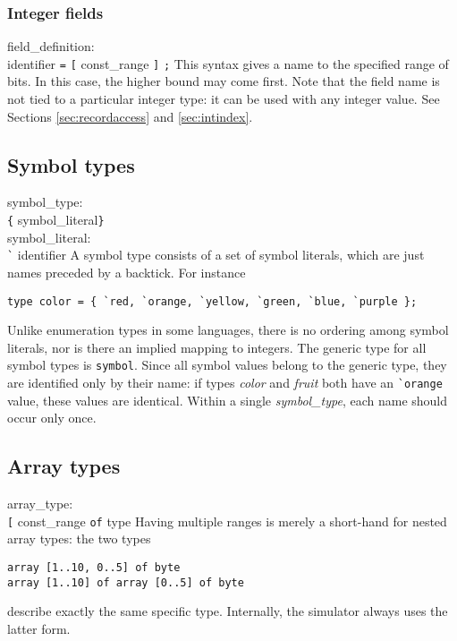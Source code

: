 
\subsubsection{Integer fields}\label{sec:fielddef}

\grammarstart
field\_definition: \\
       identifier {\tt{}=} {\tt{}[} const\_range {\tt{}]} {\tt{};}
\grammarend
This syntax gives a name to the specified range of bits. In this case,
the higher bound may come first. Note that the field name is not tied
to a particular integer type: it can be used with any integer value.
See Sections \ref{sec:recordaccess} and \ref{sec:intindex}.


\subsection{Symbol types}\label{sec:symbol}

\grammarstart
symbol\_type: \\
      \>\verb|{| symbol\_literal\LIST \verb|}|
 \\
symbol\_literal: \\
      \>\verb|`| identifier
\grammarend
A symbol type consists of a set of symbol literals, which are just names
preceded by a backtick.
For instance
\begin{verbatim}
type color = { `red, `orange, `yellow, `green, `blue, `purple };
\end{verbatim}
Unlike enumeration types in some languages, there is no ordering among
symbol literals, nor is there an implied mapping to integers. The
generic type for all symbol types is {\tt{}symbol}. Since all symbol values
belong to the generic type, they are identified only by their name:
if types {\it{}color} and {\it{}fruit} both have an \verb|`orange| value, these
values are identical. Within a single {\it{}symbol\_type},
each name should occur only once.


\subsection{Array types}\label{sec:array}

\grammarstart
array\_type: \\
       {\tt{}[} const\_range\LIST {\tt{}]} {\tt{}of} type
\grammarend
Having multiple ranges is merely a short-hand for nested array types: the
two types
\begin{verbatim}
array [1..10, 0..5] of byte
array [1..10] of array [0..5] of byte
\end{verbatim}
describe exactly the same specific type. Internally, the simulator
always uses the latter form.

